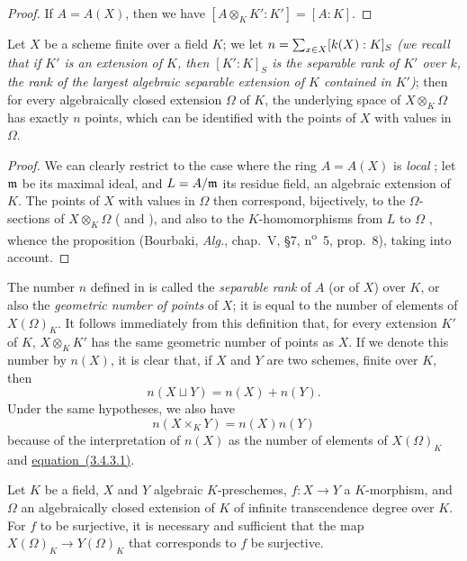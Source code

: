 \begin{proof}
\label{proof-1.6.4.6}
If $A=A(X)$, then we have $[A\otimes_K K':K']=[A:K]$.
\end{proof}

\begin{cor}[6.4.7]
\label{1.6.4.7}
Let $X$ be a scheme finite over a field $K$;
we let $n=\sum_{x\in X}[k(X):K]_S$ \emph{(we recall that if $K'$ is an extension of $K$, then $[K':K]_S$ is the \emph{separable rank} of $K'$ over $k$, the rank of the largest algebraic separable extension of $K$ contained in $K'$)};
then
for every algebraically closed extension $\Omega$ of $K$, the underlying space of $X\otimes_K\Omega$ has exactly $n$ points, which can be identified with the points of $X$ with values in $\Omega$.
\end{cor}

\begin{proof}
\label{proof-1.6.4.7}
We can clearly restrict to the case where the ring $A=A(X)$ is \emph{local} ;
let $\mathfrak{m}$ be its maximal ideal, and $L=A/\mathfrak{m}$ its residue field, an algebraic extension of $K$.
The points of $X$ with values in $\Omega$ then correspond, bijectively, to the $\Omega$-sections of $X\otimes_K\Omega$ ( and ), and also to the $K$-homomorphisms from $L$ to $\Omega$ , whence the proposition (Bourbaki, \emph{Alg.}, chap.~V, §7, n\textsuperscript{o}~5, prop.~8), taking  into account.
\end{proof}

\begin{env}[6.4.8]
\label{1.6.4.8}
The number $n$ defined in  is called the \emph{separable rank} of $A$ (or of $X$) over $K$, or also the \emph{geometric number of points} of $X$;
it is equal to the number of elements of $X(\Omega)_K$.
It follows immediately from this definition that, for every extension $K'$ of $K$, $X\otimes_K K'$ has the same geometric number of points as $X$.
If we denote this number by $n(X)$, it is clear that, if $X$ and $Y$ are two schemes, finite over $K$, then
\[
    n(X\sqcup Y)=n(X)+n(Y).\tag{6.4.8.1}
\]
Under the same hypotheses, we also have
\[
    n(X\times_K Y)=n(X)n(Y)\tag{6.4.8.2}
\]
because of the interpretation of $n(X)$ as the number of elements of $X(\Omega)_K$ and \hyperref[1.3.4.3]{equation~(3.4.3.1)}.
\end{env}

\begin{prop}[6.4.9]
\label{1.6.4.9}
Let $K$ be a field, $X$ and $Y$ algebraic $K$-preschemes, $f:X\to Y$ a $K$-morphism, and $\Omega$ an algebraically closed extension of $K$ of infinite transcendence degree over $K$.
For $f$ to be surjective, it is necessary and sufficient that the map $X(\Omega)_K\to Y(\Omega)_K$ that corresponds to $f$  be surjective.
\end{prop}


